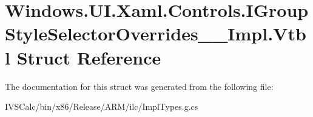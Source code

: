 \hypertarget{struct_windows_1_1_u_i_1_1_xaml_1_1_controls_1_1_i_group_style_selector_overrides_____impl_1_1_vtbl}{}\section{Windows.\+U\+I.\+Xaml.\+Controls.\+I\+Group\+Style\+Selector\+Overrides\+\_\+\+\_\+\+Impl.\+Vtbl Struct Reference}
\label{struct_windows_1_1_u_i_1_1_xaml_1_1_controls_1_1_i_group_style_selector_overrides_____impl_1_1_vtbl}


The documentation for this struct was generated from the following file\+:\begin{DoxyCompactItemize}
\item 
I\+V\+S\+Calc/bin/x86/\+Release/\+A\+R\+M/ilc/Impl\+Types.\+g.\+cs\end{DoxyCompactItemize}
